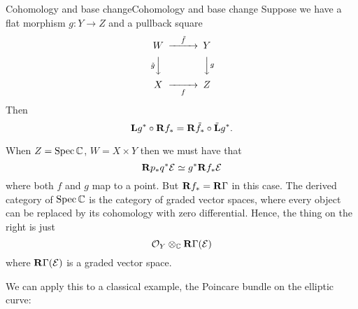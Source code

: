 \begin{theorem}{Cohomology and base change}{Cohomology and base change}
    Suppose we have a flat morphism $g:Y\to Z$ and a pullback square
    \begin{equation*}
        \begin{CD}
            W @>\tilde f>> Y \\
              @V\tilde gVV @VVgV \\
            X @>>f> Z
        \end{CD}
    \end{equation*}
    Then
    \begin{equation*}
        \mathbf{L} g^*\circ\mathbf{R} f_*=\mathbf{R}\tilde f_*\circ\tilde {\mathbf{L}} g^*.
    \end{equation*}
\end{theorem}

\begin{example}{}{}
When $Z=\operatorname{Spec}\mathbb{C}$, $W=X\times Y$ then we must have that
\begin{equation*}
    \mathbf{R} p_*q^*\mathcal{E} \simeq g^*\mathbf{R} f_*\mathcal{E}
\end{equation*}
where both $f$ and $g$ map to a point. But $\mathbf{R} f_*=\operatorname{\mathbf{R}\Gamma}$ in this case. The derived category of $\operatorname{Spec}\mathbb{C}$ is the category of graded vector spaces, where every object can be replaced by its cohomology with zero differential. Hence, the thing on the right is just
\begin{equation*}
    \mathcal{O}_Y\otimes_{\mathbb{C}}\operatorname{\mathbf{R}\Gamma}(\mathcal{E})
\end{equation*}
where $\operatorname{\mathbf{R}\Gamma}(\mathcal{E})$ is a graded vector space.

\end{example}

We can apply this to a classical example, the Poincare bundle on the elliptic curve:


